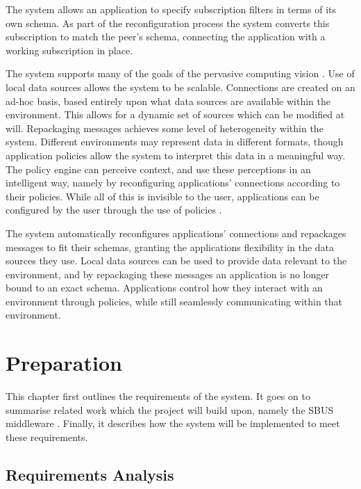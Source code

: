 \documentclass[12pt,twoside,notitlepage]{report}
\begin{document}
The system allows an application to specify subscription filters in terms of its own schema. 
As part of the reconfiguration process the system converts this subscription to match the peer's schema, connecting the application with a working subscription in place.

The system supports many of the goals of the pervasive computing vision \cite{weiser1991computer}.
Use of local data sources allows the system to be scalable. 
Connections are created on an ad-hoc basis, based entirely upon what data sources are available within the environment. 
This allows for a dynamic set of sources which can be modified at will. 
Repackaging messages achieves some level of heterogeneity within the system. 
Different environments may represent data in different formats, though application policies allow the system to interpret this data in a meaningful way. 
The policy engine can perceive context, and use these perceptions in an intelligent way, namely by reconfiguring applications' connections according to their policies. 
While all of this is invisible to the user, applications can be configured by the user through the use of policies \cite{saha2003pervasive}.

The system automatically reconfigures applications' connections and repackages messages to fit their schemas, granting the applications flexibility in the data sources they use.
Local data sources can be used to provide data relevant to the environment, and by repackaging these messages an application is no longer bound to an exact schema. 
Applications control how they interact with an environment through policies, while still seamlessly communicating within that environment.

\cleardoublepage

 
\chapter{Preparation}

This chapter first outlines the requirements of the system. 
It goes on to summarise related work which the project will build upon, namely the SBUS middleware \cite{ingram2009reconfigurable}. 
Finally, it describes how the system will be implemented to meet these requirements.


\section{Requirements Analysis}
\end{document}
